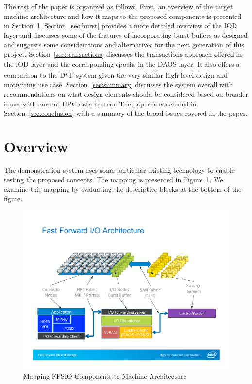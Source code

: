 \documentclass[conference]{IEEEtran}
\newcommand{\DDT}{D\textsuperscript{2}T~}
\begin{document}
The rest of the paper is organized as follows. First, an overview of the
target machine architecture and how it maps to the proposed components is
presented in Section~\ref{sec:overview}. Section~\ref{sec:burst} provides a
more detailed overview of the IOD layer and discusses some of the features of
incorporating burst buffers as designed and suggests some considerations and
alternatives for the next generation of this project.
Section~\ref{sec:transactions} discusses the transactions approach offered in
the IOD layer and the corresponding epochs in the DAOS layer. It also offers a
comparison to the \DDT system given the very similar high-level design and
motivating use case.  Section~\ref{sec:summary} discusses the system overall
with recommendations on what design elements should be considered based on
broader issues with current HPC data centers. The paper is concluded in
Section~\ref{sec:conclusion} with a summary of the broad issues covered in the
paper.

\section{Overview}
\label{sec:overview}

The demonstration system uses some particular existing technology to enable
testing the proposed concepts. The mapping is presented in
Figure~\ref{fig:arch-mapping}. We examine this mapping by evaluating the
descriptive blocks at the bottom of the figure.

\begin{figure}[ht]
\centering
\includegraphics[keepaspectratio=true, width=\columnwidth]{images/arch-mapping}
\caption{Mapping FFSIO Components to Machine Architecture}
\label{fig:arch-mapping}
\end{figure}
\end{document}
